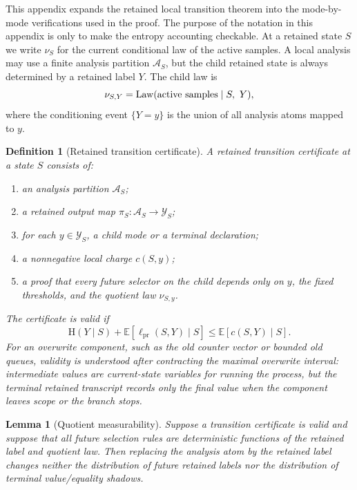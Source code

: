 \documentclass[11pt]{article}
\newtheorem{lemma}[theorem]{Lemma}
\newtheorem{definition}[theorem]{Definition}
\theoremstyle{remark}
\newcommand{\E}{\mathbb E}
\newcommand{\HH}{\mathrm H}
\newcommand{\Law}{\operatorname{Law}}
\newcommand{\pr}{\mathrm{pr}}
\begin{document}
This appendix expands the retained local transition theorem into the mode-by-mode verifications used in the proof.  The purpose of the notation in this appendix is only to make the entropy accounting checkable.  At a retained state $S$ we write $\nu_S$ for the current conditional law of the active samples.  A local analysis may use a finite analysis partition $\mathcal A_S$, but the child retained state is always determined by a retained label $Y$.  The child law is
\[
        \nu_{S,Y}=\Law(\hbox{active samples}\mid S,\ Y),
\]
where the conditioning event $\{Y=y\}$ is the union of all analysis atoms mapped to $y$.

\begin{definition}[Retained transition certificate]\label{def:rtc}
A retained transition certificate at a state $S$ consists of:
\begin{enumerate}[label=\textup{(\roman*)}]
\item an analysis partition $\mathcal A_S$;
\item a retained output map $\pi_S:\mathcal A_S\to\mathcal Y_S$;
\item for each $y\in\mathcal Y_S$, a child mode or a terminal declaration;
\item a nonnegative local charge $c(S,y)$;
\item a proof that every future selector on the child depends only on $y$, the fixed thresholds, and the quotient law $\nu_{S,y}$.
\end{enumerate}
The certificate is valid if
\[
        \HH(Y\mid S)+\E[\ell_{\pr}(S,Y)\mid S]\le \E[c(S,Y)\mid S].
\]
For an overwrite component, such as the old counter vector or bounded old queues, validity is understood after contracting the maximal overwrite interval: intermediate values are current-state variables for running the process, but the terminal retained transcript records only the final value when the component leaves scope or the branch stops.
\end{definition}

\begin{lemma}[Quotient measurability]\label{lem:quotient-meas-app}
Suppose a transition certificate is valid and suppose that all future selection rules are deterministic functions of the retained label and quotient law.  Then replacing the analysis atom by the retained label changes neither the distribution of future retained labels nor the distribution of terminal value/equality shadows.
\end{lemma}
\end{document}
